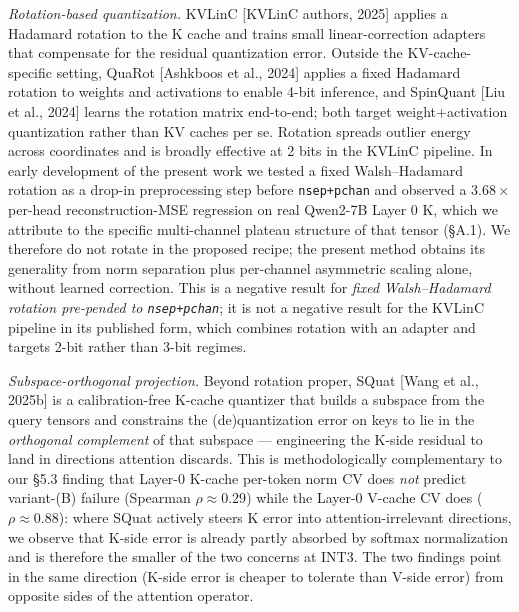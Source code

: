 \emph{Rotation-based quantization.} KVLinC {[}KVLinC authors, 2025{]}
applies a Hadamard rotation to the K cache and trains small
linear-correction adapters that compensate for the residual quantization
error. Outside the KV-cache-specific setting, QuaRot {[}Ashkboos et al.,
2024{]} applies a fixed Hadamard rotation to weights and activations to
enable 4-bit inference, and SpinQuant {[}Liu et al., 2024{]} learns the
rotation matrix end-to-end; both target weight+activation quantization
rather than KV caches per se. Rotation spreads outlier energy across
coordinates and is broadly effective at 2 bits in the KVLinC pipeline.
In early development of the present work we tested a fixed
Walsh--Hadamard rotation as a drop-in preprocessing step before
\texttt{nsep+pchan} and observed a \(3.68\times\) per-head
reconstruction-MSE regression on real Qwen2-7B Layer 0 K, which we
attribute to the specific multi-channel plateau structure of that tensor
(§A.1). We therefore do not rotate in the proposed recipe; the present
method obtains its generality from norm separation plus per-channel
asymmetric scaling alone, without learned correction. This is a negative
result for \emph{fixed Walsh--Hadamard rotation pre-pended to
\texttt{nsep+pchan}}; it is not a negative result for the KVLinC
pipeline in its published form, which combines rotation with an adapter
and targets 2-bit rather than 3-bit regimes.

\emph{Subspace-orthogonal projection.} Beyond rotation proper, SQuat
{[}Wang et al., 2025b{]} is a calibration-free K-cache quantizer that
builds a subspace from the query tensors and constrains the
(de)quantization error on keys to lie in the \emph{orthogonal
complement} of that subspace --- engineering the K-side residual to land
in directions attention discards. This is methodologically complementary
to our §5.3 finding that Layer-0 K-cache per-token norm CV does
\emph{not} predict variant-(B) failure (Spearman \(\rho \approx 0.29\))
while the Layer-0 V-cache CV does (\(\rho \approx 0.88\)): where SQuat
actively steers K error into attention-irrelevant directions, we observe
that K-side error is already partly absorbed by softmax normalization
and is therefore the smaller of the two concerns at INT3. The two
findings point in the same direction (K-side error is cheaper to
tolerate than V-side error) from opposite sides of the attention
operator.

